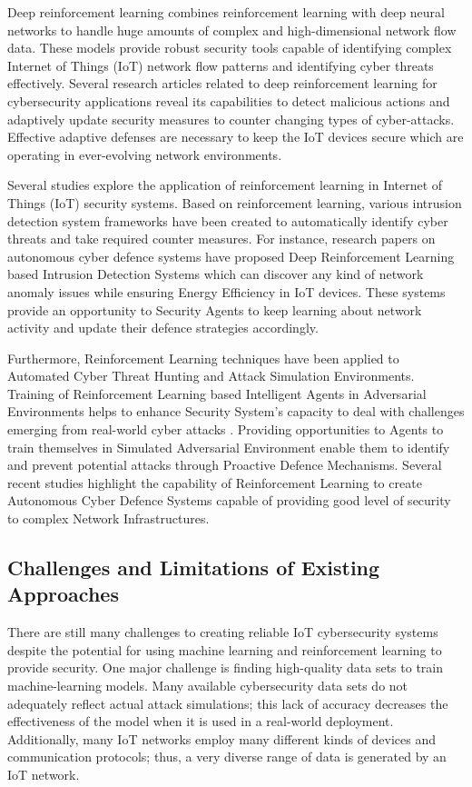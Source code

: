 \documentclass[12pt]{article}
\begin{document}
Deep reinforcement learning combines reinforcement learning with deep neural networks to handle huge amounts of complex and high-dimensional network flow data. These models provide robust security tools capable of identifying complex Internet of Things (IoT) network flow patterns and identifying cyber threats effectively. Several research articles related to deep reinforcement learning for cybersecurity applications reveal its capabilities to detect malicious actions and adaptively update security measures to counter changing types of cyber-attacks. Effective adaptive defenses are necessary to keep the IoT devices secure which are operating in ever-evolving network environments.

Several studies explore the application of reinforcement learning in Internet of Things (IoT) security systems. Based on reinforcement learning, various intrusion detection system frameworks have been created to automatically identify cyber threats and take required counter measures. For instance, research papers on autonomous cyber defence systems have proposed Deep Reinforcement Learning based Intrusion Detection Systems which can discover any kind of network anomaly issues while ensuring Energy Efficiency in IoT devices.  These systems provide an opportunity to Security Agents to keep learning about network activity and update their defence strategies accordingly.  

Furthermore, Reinforcement Learning techniques have been applied to Automated Cyber Threat Hunting and Attack Simulation Environments. Training of Reinforcement Learning based Intelligent Agents in Adversarial Environments helps to enhance Security System's capacity to deal with challenges emerging from real-world cyber attacks  . Providing opportunities to Agents to train themselves in Simulated Adversarial Environment enable them to identify and prevent potential attacks through Proactive Defence Mechanisms. Several recent studies highlight the capability of Reinforcement Learning to create Autonomous Cyber Defence Systems capable of providing good level of security to complex Network Infrastructures.\cite{Nguyen2023,Palmer2024,Jamshidi2025,Li2024,Alnfiai2025}
\subsection{Challenges and Limitations of Existing Approaches}
There are still many challenges to creating reliable IoT cybersecurity systems despite the potential for using machine learning and reinforcement learning to provide security. One major challenge is finding high-quality data sets to train machine-learning models. Many available cybersecurity data sets do not adequately reflect actual attack simulations; this lack of accuracy decreases the effectiveness of the model when it is used in a real-world deployment. Additionally, many IoT networks employ many different kinds of devices and communication protocols; thus, a very diverse range of data is generated by an IoT network.
\end{document}
